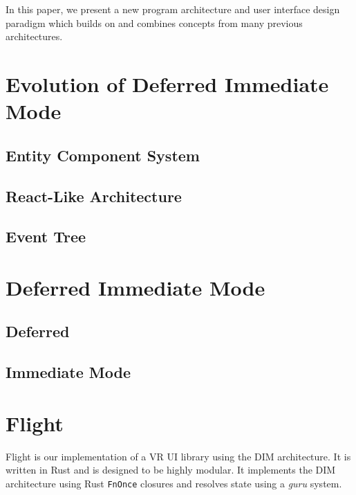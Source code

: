 \documentclass[conference,12pt]{IEEEtran}
\begin{document}
In this paper, we present a new program architecture and user interface design
paradigm which builds on and combines concepts from many previous architectures.

\section{Evolution of Deferred Immediate Mode}

\subsection{Entity Component System}

\subsection{React-Like Architecture}

\subsection{Event Tree}

\section{Deferred Immediate Mode}

\subsection{Deferred}

\subsection{Immediate Mode}

\section{Flight}
Flight is our implementation of a VR UI library using the DIM architecture. It
is written in Rust and is designed to be highly modular. It implements the DIM
architecture using Rust \texttt{FnOnce} closures and resolves state using a
\textit{guru} system.
\end{document}
